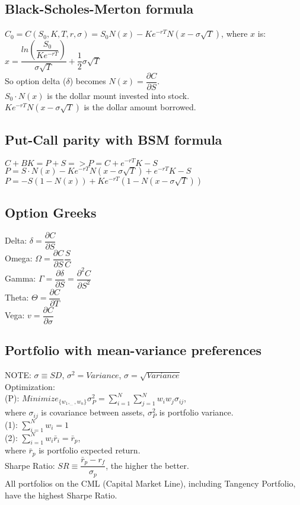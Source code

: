 \subsection*{Black-Scholes-Merton formula}
$C_0=C(S_0,K,T,r,\sigma) = S_0N(x) - Ke^{-rT}N(x-\sigma\sqrt{T})$, where $x$ is: $x=\dfrac{ln\left(\dfrac{S_0}{Ke^{-rT}}\right)}{\sigma\sqrt{T}} + \dfrac{1}{2}\sigma\sqrt{T}$\\
So option delta ($\delta$) becomes $N(x) = \dfrac{\partial C}{\partial S}$.\\
$S_0\cdot N(x)$ is the dollar mount invested into stock.\\
$Ke^{-rT}N(x-\sigma\sqrt{T})$ is the dollar amount borrowed.
\subsection*{Put-Call parity with BSM formula}
$C + BK = P + S => P = C + e^{-rT}K - S$\\
$P = S\cdot N(x) - Ke^{-rT}N(x - \sigma\sqrt{T}) + e^{-rT}K-S$\\
$P = -S(1-N(x)) + Ke^{-rT}(1-N(x-\sigma\sqrt{T}))$
\subsection*{Option Greeks}
Delta: $\delta = \dfrac{\partial C}{\partial S}$\\
Omega: $\Omega = \dfrac{\partial C}{\partial S}\dfrac{S}{C}$\\
Gamma: $\Gamma = \dfrac{\partial \delta}{\partial S} = \dfrac{\partial^2C}{\partial S^2}$\\
Theta: $\Theta = \dfrac{\partial C}{\partial T}$\\
Vega: $v = \dfrac{\partial C}{\partial \sigma}$
\subsection*{Portfolio with mean-variance preferences}
NOTE: $\sigma \equiv SD$, $\sigma^2 = Variance$, $\sigma = \sqrt{Variance}$\\
Optimization:\\
(P): $Minimize_{\{w_1,_{\cdots},w_n\}} \sigma_P^2 = \sum_{i=1}^N\sum_{j=1}^Nw_iw_j\sigma_{ij}$, \\
where $\sigma_{ij}$ is covariance between assets, $\sigma_P^2$ is portfolio variance.\\
(1): $\sum_{i=1}^Nw_i = 1$\\
(2): $\sum_{i=1}^Nw_i\bar{r}_i = \bar{r}_p$,\\
where $\bar{r}_p$ is portfolio expected return.\\
Sharpe Ratio: $SR \equiv \dfrac{\bar{r}_p - r_f}{\sigma_p}$, the higher the better.\\
All portfolios on the CML (Capital Market Line), including Tangency Portfolio, have the highest Sharpe Ratio.
